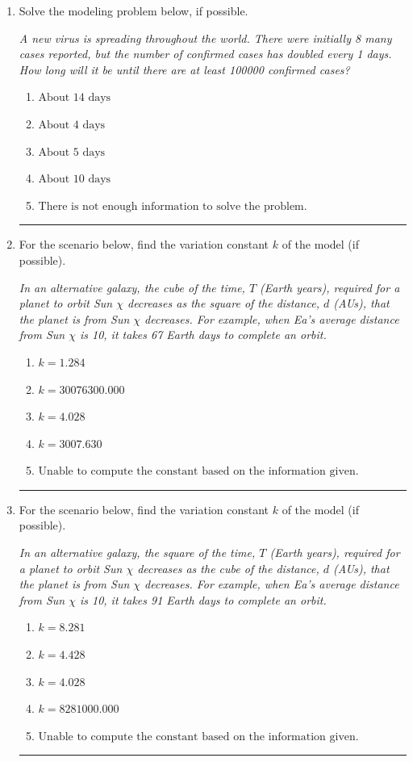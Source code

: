 \documentclass[14pt]{extbook}
\newcommand{\litem}[1]{\item#1\hspace*{-1cm}\rule{\textwidth}{0.4pt}}
\begin{document}
\begin{enumerate}
\litem{
Solve the modeling problem below, if possible.
\begin{center}
    \textit{ A new virus is spreading throughout the world. There were initially 8 many cases reported, but the number of confirmed cases has doubled every 1 days. How long will it be until there are at least 100000 confirmed cases? }
\end{center}
\begin{enumerate}[label=\Alph*.]
\item \( \text{About } 14 \text{ days} \)
\item \( \text{About } 4 \text{ days} \)
\item \( \text{About } 5 \text{ days} \)
\item \( \text{About } 10 \text{ days} \)
\item \( \text{There is not enough information to solve the problem.} \)

\end{enumerate} }
\litem{
For the scenario below, find the variation constant $k$ of the model (if possible).
\begin{center}
    \textit{ In an alternative galaxy, the cube of the time, $T$ (Earth years), required for a planet to orbit Sun $\chi$ decreases as the square of the distance, $d$ (AUs), that the planet is from Sun $\chi$ decreases. For example, when Ea's average distance from Sun $\chi$ is 10, it takes 67 Earth days to complete an orbit. }
\end{center}
\begin{enumerate}[label=\Alph*.]
\item \( k = 1.284 \)
\item \( k = 30076300.000 \)
\item \( k = 4.028 \)
\item \( k = 3007.630 \)
\item \( \text{Unable to compute the constant based on the information given.} \)

\end{enumerate} }
\litem{
For the scenario below, find the variation constant $k$ of the model (if possible).
\begin{center}
    \textit{ In an alternative galaxy, the square of the time, $T$ (Earth years), required for a planet to orbit Sun $\chi$ decreases as the cube of the distance, $d$ (AUs), that the planet is from Sun $\chi$ decreases. For example, when Ea's average distance from Sun $\chi$ is 10, it takes 91 Earth days to complete an orbit. }
\end{center}
\begin{enumerate}[label=\Alph*.]
\item \( k = 8.281 \)
\item \( k = 4.428 \)
\item \( k = 4.028 \)
\item \( k = 8281000.000 \)
\item \( \text{Unable to compute the constant based on the information given.} \)


\end{enumerate}}
\end{enumerate}
\end{document}
